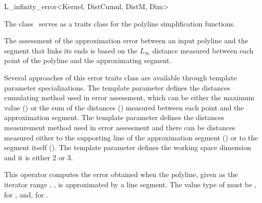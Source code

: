 
\begin{ccRefClass}{L_infinity_error<Kernel, DistCumul, DistM, Dim>}

\ccDefinition
  
The class \ccRefName\ serves as a traits class for the polyline
simplification functions.

The assessment of the approximation error between an
input polyline and the segment that links its ends is based on the
$L_\infty$ distance measured between each point of the polyline and the
approximating segment.

Several approaches of this error traits class are available through
template parameter specializations. The  template parameter
defines the distances cumulating method used in error assessment,
which can be either the maximum value () or the sum of the distances
()
measured between each point and the approximation segment.
The  template parameter defines the distances measurement method used
in error assessment and there can be distances measured either to the
supporting line of the approximation segment () or to the
segment itself (). The  template parameter defines the working space dimension
and it is either 2 or 3.




\ccIsModel



\ccTypes


\ccOperations

{This operator computes the error obtained when the polyline, given as the iterator range , , 
is approximated by a line segment. The value type of  must be , for ,
and, for .}


\end{ccRefClass}
